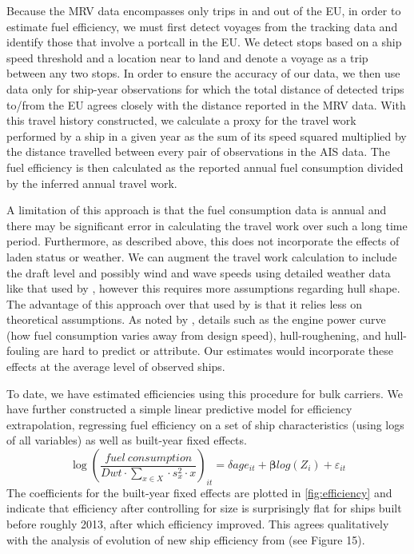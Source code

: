 \documentclass[hidelinks, 12pt,letterpaper]{article}
\begin{document}
Because the MRV data encompasses only trips in and out of the EU, in order to estimate fuel efficiency, we must first detect voyages from the tracking data and identify those that involve a portcall in the EU. We detect stops based on a ship speed threshold and a location near to land and denote a voyage as a trip between any two stops. In order to ensure the accuracy of our data, we then use data only for ship-year observations for which the total distance of detected trips to/from the EU agrees closely with the distance reported in the MRV data. With this travel history constructed, we calculate a proxy for the travel work performed by a ship in a given year as the sum of its speed squared multiplied by the distance travelled between every pair of observations in the AIS data. The fuel efficiency is then calculated as the reported annual fuel consumption divided by the inferred annual travel work. 

A limitation of this approach is that the fuel consumption data is annual and there may be significant error in calculating the travel work over such a long time period. Furthermore, as described above, this does not incorporate the effects of laden status or weather. We can augment the travel work calculation to include the draft level and possibly wind and wave speeds using detailed weather data like that used by \citet{brancaccio2020geography}, however this requires more assumptions regarding hull shape. The advantage of this approach over that used by \citet{faber2020fourth} is that it relies less on theoretical assumptions. As noted by \citet{olmer2017greenhouse}, details such as the engine power curve (how fuel consumption varies away from design speed), hull-roughening, and hull-fouling are hard to predict or attribute. Our estimates would incorporate these effects at the average level of observed ships.

To date, we have estimated efficiencies using this procedure for bulk carriers. We have further constructed a simple linear predictive model for efficiency extrapolation, regressing fuel efficiency on a set of ship characteristics (using logs of all variables) as well as built-year fixed effects. 
 \begin{equation}
 \log\left(
     \frac{fuel~consumption}{Dwt \cdot \sum_{x \in X}  \cdot s_x^2 \cdot x}
 \right)_{it}    
         = \delta age_{it} + \boldsymbol{\beta}log(Z_i) + \varepsilon_{it}
 \end{equation}
The coefficients for the built-year fixed effects are plotted in \autoref{fig:efficiency} and indicate that efficiency after controlling for size is surprisingly flat for ships built before roughly 2013, after which efficiency improved. This agrees qualitatively with the analysis of evolution of new ship efficiency from \citet{faber2015historical} (see Figure 15).
\end{document}
